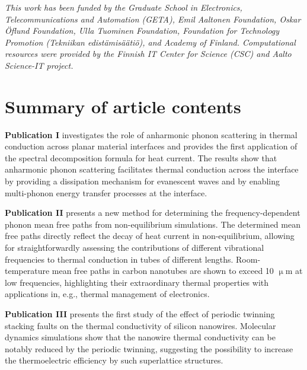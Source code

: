 \documentclass[dissertation]{aaltoseries}
\begin{document}
\vspace{1cm}

\noindent
\textit{This work has been funded by the Graduate School in Electronics, Telecommunications and Automation (GETA), Emil Aaltonen Foundation, Oskar \"Oflund Foundation, Ulla Tuominen Foundation, Foundation for Technology Promotion (Tekniikan edist\"amis\"a\"ati\"o), and Academy of Finland. Computational resources were provided by the Finnish IT Center for Science (CSC) and Aalto Science-IT project.}

\tableofcontents

\listofpublications

\chapter*{Summary of article contents}

\textbf{Publication I} investigates the role of anharmonic phonon scattering in thermal conduction across planar material interfaces and provides the first application of the spectral decomposition formula for heat current. The results show that anharmonic phonon scattering facilitates thermal conduction across the interface by providing a dissipation mechanism for evanescent waves and by enabling multi-phonon energy transfer processes at the interface.

\vspace{1cm}
\noindent
\textbf{Publication II} presents a new method for determining the frequency-dependent phonon mean free paths from non-equilibrium simulations. The determined mean free paths directly reflect the decay of heat current in non-equilibrium, allowing for straightforwardly assessing the contributions of different vibrational frequencies to thermal conduction in tubes of different lengths. Room-temperature mean free paths in carbon nanotubes are shown to exceed 10 $\upmu$m at low frequencies, highlighting their extraordinary thermal properties with applications in, e.g., thermal management of electronics. 

\vspace{1cm}
\noindent
\textbf{Publication III} presents the first study of the effect of periodic twinning stacking faults on the thermal conductivity of silicon nanowires. Molecular dynamics simulations show that the nanowire thermal conductivity can be notably reduced by the periodic twinning, suggesting the possibility to increase the thermoelectric efficiency by such superlattice structures.
\end{document}
